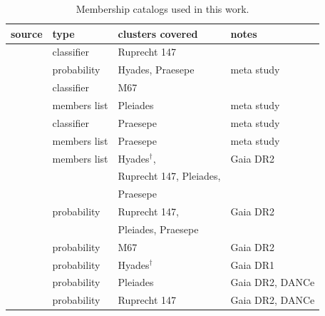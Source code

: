 \documentclass{aa}
\begin{document}
\begin{appendix}
\begin{table}
\caption{Membership catalogs used in this work.}
\label{tab:app:memberships}
\centering
\begin{tabular}{llll}     %
\hline\hline
     source  & type  & clusters covered & notes\\
\hline
   \citet{curtis2013} & classifier & Ruprecht 147 & \\
   \citet{douglas_praesepe_hyades_2014} & probability & Hyades, Praesepe & meta study \\
   \citet{gonzalez_m67mem_2016} & classifier & M67 & \\
   \citet{rebull_pleiadesrot_2016} & members list & Pleiades & meta study\\
   \citet{rebull_praesepe_2017} & classifier & Praesepe & meta study\\
   \citet{douglas_poking_2017} & members list & Praesepe & meta study\\
   \citet{gaia_dr2_2018_hrd} & members list & Hyades$^{\dagger}$,   & Gaia DR2\\
   &&Ruprecht 147, Pleiades, &\\
   &&Praesepe&\\
   \citet{cantat_gaudin_2018} & probability & Ruprecht 147, & Gaia DR2\\
   && Pleiades, Praesepe&\\
   \citet{gao_m67mem_2018} & probability & M67 & Gaia DR2\\
   \citet{reino_hyades_2018} & probability & Hyades$^{\dagger}$ & Gaia DR1\\
   \citet{olivares_pleiades_2018} & probability & Pleiades & Gaia DR2, DANCe\\
   \citet{olivares_ngc6774_2019} & probability & Ruprecht 147 & Gaia DR2, DANCe\\
\hline
\end{tabular}
\end{table}



\end{appendix}
\end{document}
